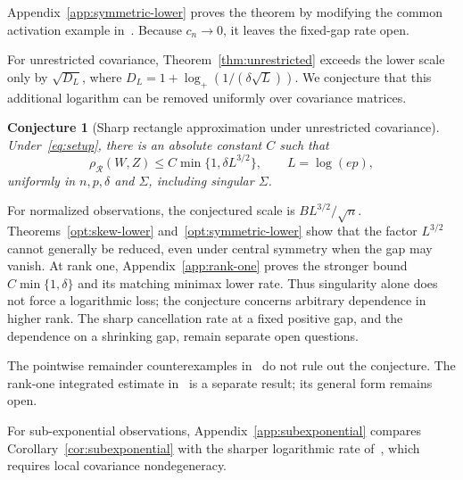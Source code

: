 \documentclass[11pt,letterpaper]{article}
\newtheorem{conjecture}{Conjecture}
\theoremstyle{remark}
\newcommand{\rh}{\rho_{\mathcal R}}
\begin{document}
Appendix~\ref{app:symmetric-lower} proves the theorem by modifying
the common activation example in~\cite[Proposition~E.1]{FKLZ}.
Because \(c_n\to0\), it leaves the fixed-gap rate open.

For unrestricted covariance, Theorem~\ref{thm:unrestricted} exceeds
the lower scale only by \(\sqrt{D_L}\), where
\(D_L=1+\log_+(1/(\delta\sqrt L))\). We conjecture that this
additional logarithm can be removed uniformly over covariance matrices.
\begin{conjecture}[Sharp rectangle approximation under unrestricted covariance]
\label{conj:sharp-unrestricted}
Under~\eqref{eq:setup}, there is an absolute constant \(C\) such that
\[
 \rh(W,Z)\le C\min\{1,\delta L^{3/2}\},\qquad L=\log(ep),
\]
uniformly in \(n,p,\delta\) and \(\Sigma\), including singular \(\Sigma\).
\end{conjecture}
For normalized observations, the conjectured scale is
\(BL^{3/2}/\sqrt n\). Theorems~\ref{opt:skew-lower}
and~\ref{opt:symmetric-lower} show that the factor \(L^{3/2}\)
cannot generally be reduced, even under central symmetry when the gap
may vanish. At rank one, Appendix~\ref{app:rank-one} proves the stronger
bound \(C\min\{1,\delta\}\) and its matching minimax lower rate.
Thus singularity alone does not force a logarithmic loss; the conjecture
concerns arbitrary dependence in higher rank. The sharp cancellation
rate at a fixed positive gap, and the dependence on a shrinking gap,
remain separate open questions.

The pointwise remainder counterexamples in~\cite{Obstruction} do not
rule out the conjecture. The rank-one integrated estimate
in~\cite{IntegratedRemainder} is a separate result; its general form
remains open.

For sub-exponential observations, Appendix~\ref{app:subexponential}
compares Corollary~\ref{cor:subexponential} with the sharper logarithmic
rate of~\cite{Local}, which requires local covariance nondegeneracy.
\end{document}
